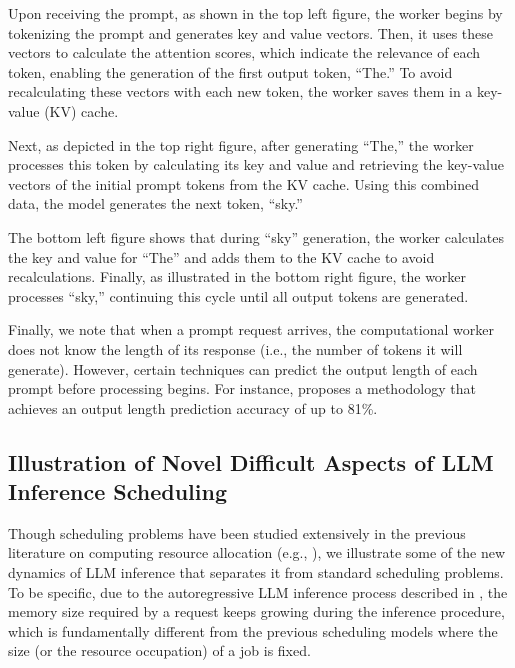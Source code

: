 \documentclass[11pt, a4paper]{article}
\theoremstyle{plain}
\theoremstyle{definition}
\theoremstyle{remark}
\begin{document}
Upon receiving the prompt, as shown in the top left figure, the worker begins by tokenizing the prompt and generates key and value vectors. Then, it uses these vectors to calculate the attention scores, which indicate the relevance of each token, enabling the generation of the first output token, “The.” To avoid recalculating these vectors with each new token, the worker saves them in a key-value (KV) cache.

Next, as depicted in the top right figure, after generating “The,” the worker processes this token by calculating its key and value and retrieving the key-value vectors of the initial prompt tokens from the KV cache. Using this combined data, the model generates the next token, “sky.”

The bottom left figure shows that during “sky” generation, the worker calculates the key and value for “The” and adds them to the KV cache to avoid recalculations. Finally, as illustrated in the bottom right figure, the worker processes “sky,” continuing this cycle until all output tokens are generated.

Finally, we note that when a prompt request arrives, the computational worker does not know the length of its response (i.e., the number of tokens it will generate). However, certain techniques can predict the output length of each prompt before processing begins. For instance, \cite{zheng2024response} proposes a methodology that achieves an output length prediction accuracy of up to 81\%.


\subsection{Illustration of Novel Difficult Aspects of LLM Inference Scheduling} \label{subsec:diff}


Though scheduling problems have been studied extensively in the previous literature on computing resource allocation (e.g., \cite{pinedo2012scheduling}), we illustrate some of the new dynamics of LLM inference that separates it from standard scheduling problems. 
To be specific, due to the autoregressive LLM inference process described in , the memory size required by a request keeps growing during the inference procedure, which is fundamentally different from the previous scheduling models where the size (or the resource occupation) of a job is fixed. 
\end{document}
